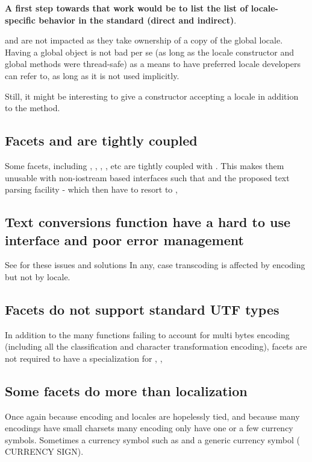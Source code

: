 \documentclass{wg21}
\newcommand{\UnicodeLetter}[1]{\textbf{\textcolor{BrickRed}{\Large\tcode{#1}}}}
\begin{document}
\textbf{A first step towards that work would be to list the list of locale-specific behavior in the standard (direct and indirect)}.

 and  are not impacted as they take ownership of a copy of the global locale.
Having a global object is not bad per se (as long as the locale constructor and global methods were thread-safe) as a means to have preferred locale developers can refer to, as long as it is not used implicitly.

Still, it might be interesting to give  a constructor accepting a locale in addition to the  method.

\subsection{Facets and  are tightly coupled}

Some facets, including , , , , etc are tightly coupled with .
This makes them unusable with non-iostream based interfaces such that  and the proposed text parsing facility \cite{P1729R1} - which then have to resort to , 

\subsection{Text conversions function have a hard to use interface and poor error management}

See \cite{P1629R0} for these issues and solutions
In any, case transcoding is affected by encoding but not by locale.
\subsection{Facets do not support standard UTF types}

In addition to the many functions failing to account for multi bytes encoding (including all the classification and character transformation encoding), facets are not required to have a specialization for , , 

\subsection{Some facets do more than localization}
Once again because encoding and locales are hopelessly tied, and because many encodings have small charsets many encoding only have one or a few currency symbols. Sometimes a currency symbol such as \UnicodeLetter{\$} and a generic currency symbol (\UnicodeLetter{¤} CURRENCY SIGN).
\end{document}

